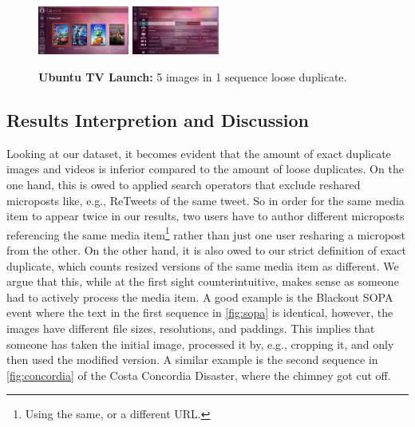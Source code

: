 \documentclass{acm_proc_article-sp}
\newcommand{\thumbheight}{16mm}
\newenvironment{thumbsequence}{}{\makebox[4mm]{}}
\begin{document}
\begin{figure}
\begin{centering}
\begin{thumbsequence}
		\includegraphics[height=\thumbheight]{resources/ubuntu/looseduplicate4.jpg}
		\includegraphics[height=\thumbheight]{resources/ubuntu/looseduplicate5.png}
	\end{thumbsequence}
	\caption{\textbf{Ubuntu TV Launch:} 5 images in 1 sequence loose duplicate.}
	\label{fig:ubuntutv}
\end{centering}
\end{figure}

\subsection{Results Interpretion and Discussion}
Looking at our dataset, it becomes evident that the amount of exact duplicate images and videos is inferior compared to the amount of loose duplicates.
On the one hand, this is owed to applied search operators that exclude reshared microposts like, e.g., ReTweets of the same tweet.
So in order for the same media item to appear twice in our results, two users have to author different microposts referencing the same media item\footnote{Using the same, or a different URL.} rather than just one user resharing a micropost from the other.
On the other hand, it is also owed to our strict definition of exact duplicate, which counts resized versions of the same media item as different.
We argue that this, while at the first sight counterintuitive,
makes sense as someone had to actively process the media item.
A good example is the Blackout SOPA event where the text in the first sequence in \autoref{fig:sopa} is identical, however,
the images have different file sizes, resolutions, and paddings.
This implies that someone has taken the initial image, processed it by, e.g.,
cropping it, and only then used the modified version.
A similar example is the second sequence in \autoref{fig:concordia} of the Costa Concordia Disaster, where the chimney got cut off.
\end{document}
